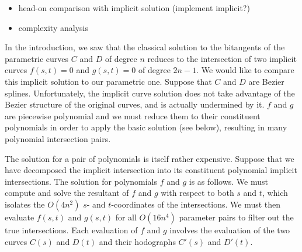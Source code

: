 \documentclass[12pt]{article}
\begin{document}
\begin{itemize}
\item head-on comparison with implicit solution (implement implicit?)
\item complexity analysis
\end{itemize}


In the introduction, we saw that the classical solution to the bitangents
of the parametric curves $C$ and $D$ of degree $n$
reduces to the intersection of two implicit curves $f(s,t)=0$ and $g(s,t)=0$
of degree $2n-1$.
We would like to compare this implicit solution to our parametric one.
Suppose that $C$ and $D$ are Bezier splines.
Unfortunately, the implicit curve solution does not take advantage
of the Bezier structure of the original curves,
and is actually undermined by it.
$f$ and $g$ are piecewise polynomial and 
we must reduce them to their constituent polynomials in order
to apply the basic solution (see below), resulting
in many polynomial intersection pairs.

The solution for a pair of polynomials is itself rather expensive.
Suppose that we have decomposed the implicit intersection into
its constituent polynomial implicit intersections.
The solution for polynomials $f$ and $g$ is as follows.
We must compute and solve the resultant of $f$ and $g$
with respect to both $s$ and $t$, which isolates the $O(4n^2)$ $s$- and 
$t$-coordinates of the intersections.
We must then evaluate $f(s,t)$ and $g(s,t)$ for all $O(16n^4)$ parameter pairs
to filter out the true intersections.
Each evaluation of $f$ and $g$ involves the evaluation of 
the two curves $C(s)$ and $D(t)$ and their hodographs $C'(s)$ and $D'(t)$.
\end{document}
